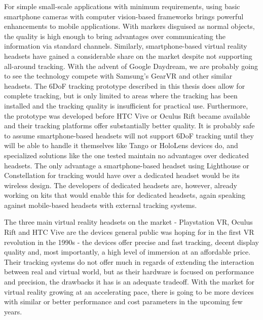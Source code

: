 \documentclass[12pt, a4paper]{article}
\begin{document}
For simple small-scale applications with minimum requirements, using basic smartphone cameras with computer vision-based frameworks brings powerful enhancements to mobile applications. With markers disguised as normal objects, the quality is high enough to bring advantages over communicating the information via standard channels. Similarly, smartphone-based virtual reality headsets have gained a considerable share on the market despite not supporting all-around tracking. With the advent of Google Daydream, we are probably going to see the technology compete with Samsung’s GearVR and other similar headsets. The 6DoF tracking prototype described in this thesis does allow for complete tracking, but is only limited to areas where the tracking has been installed and the tracking quality is insufficient for practical use. Furthermore, the prototype was developed before HTC Vive or Oculus Rift became available and their tracking platforms offer substantially better quality. It is probably safe to assume smartphone-based headsets will not support 6DoF tracking until they will be able to handle it themselves like Tango or HoloLens devices do, and specialized solutions like the one tested maintain no advantages over dedicated headsets. The only advantage a smartphone-based headset using Lighthouse or Constellation for tracking would have over a dedicated headset would be its wireless design. The developers of dedicated headsets are, however, already working on kits that would enable this for dedicated headsets, again speaking against mobile-based headsets with external tracking systems.

The three main virtual reality headsets on the market - Playstation VR, Oculus Rift and HTC Vive are the devices general public was hoping for in the first VR revolution in the 1990s - the devices offer precise and fast tracking, decent display quality and, most importantly, a high level of immersion at an affordable price. Their tracking systems do not offer much in regards of extending the interaction between real and virtual world, but as their hardware is focused on performance and precision, the drawbacks it has is an adequate tradeoff. With the market for virtual reality growing at an accelerating pace, there is going to be more devices with similar or better performance and cost parameters in the upcoming few years.
\end{document}
